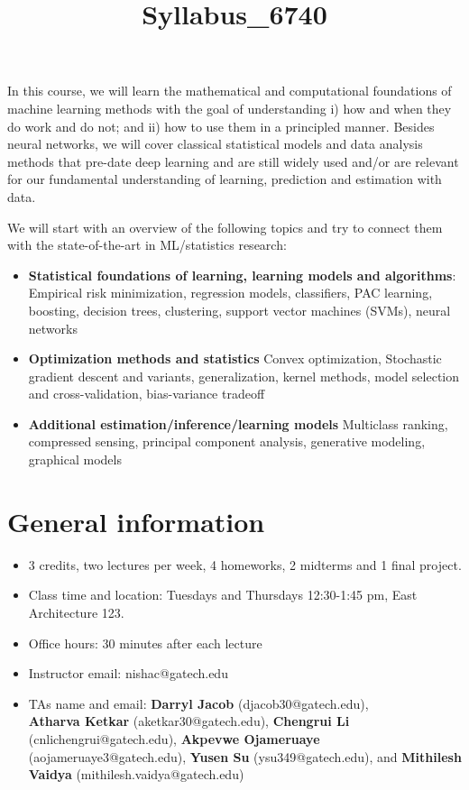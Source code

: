 \documentclass[12pt]{article}
\title{Syllabus_6740}
\begin{document}
\MakeScribeTop

In this course, we will learn the mathematical and computational foundations of machine learning methods with the goal of understanding i) how and when they do work and do not; and ii) how to use them in a principled manner. Besides neural networks, we will cover classical statistical models and data analysis methods that pre-date deep learning and are still widely used and/or are relevant for our fundamental understanding of learning, prediction and estimation with data.

We will start with an overview of the following topics and try to connect them with the state-of-the-art in ML/statistics research:
\begin{itemize}
	\item \textbf{Statistical foundations of learning, learning models and algorithms}: Empirical risk minimization, regression models, classifiers, PAC learning, boosting, decision trees, clustering, support vector machines (SVMs), neural networks 
	\item \textbf{Optimization methods and statistics} Convex optimization, Stochastic gradient descent and variants, generalization, kernel methods, model selection and cross-validation, bias-variance tradeoff
	\item \textbf{Additional estimation/inference/learning models} Multiclass ranking, compressed sensing, principal component analysis, generative modeling, graphical models
\end{itemize}
\section{General information}
\begin{itemize}
	\item 3 credits, two lectures per week, 4 homeworks, 2 midterms and 1 final project.
	\item Class time and location: Tuesdays and Thursdays 12:30-1:45 pm, East Architecture 123.
	\item Office hours: 30 minutes after each lecture
	\item Instructor email: nishac@gatech.edu
	\item TAs name and email: \textbf{Darryl Jacob} (djacob30@gatech.edu), 
		\\ \textbf{Atharva Ketkar} (aketkar30@gatech.edu),
		\textbf{Chengrui Li} (cnlichengrui@gatech.edu), 
		\textbf{Akpevwe Ojameruaye} (aojameruaye3@gatech.edu), 
		\textbf{Yusen Su} (ysu349@gatech.edu), 
		and \textbf{Mithilesh Vaidya} (mithilesh.vaidya@gatech.edu) 
\end{itemize}
\end{document}
